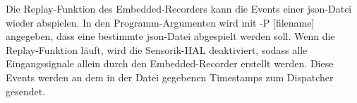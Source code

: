 Die Replay-Funktion des Embedded-Recorders kann die Events einer json-Datei wieder abspielen.
In den Programm-Argumenten wird mit -P [filename] angegeben, dass eine bestimmte json-Datei abgespielt werden soll.
Wenn die Replay-Funktion läuft, wird die Sensorik-HAL deaktiviert,
sodass alle Eingangssignale allein durch den Embedded-Recorder erstellt werden.
Diese Events werden an dem in der Datei gegebenen Timestamps zum Dispatcher gesendet.
